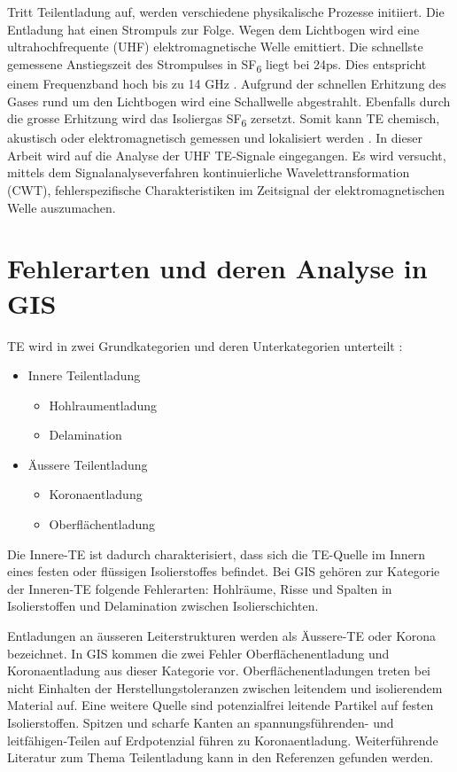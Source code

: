 \begin{refsection}
Tritt Teilentladung auf, werden verschiedene  physikalische Prozesse initiiert. 
Die Entladung hat einen Strompuls zur Folge.
Wegen dem Lichtbogen wird eine ultrahochfrequente (UHF) elektromagnetische Welle emittiert.
Die schnellste gemessene Anstiegszeit des Strompulses in SF\textsubscript{6} liegt bei 24ps.
Dies entspricht einem Frequenzband hoch bis zu 14 GHz \cite{skript:Judd24ps}. 
Aufgrund der schnellen Erhitzung des Gases rund um den Lichtbogen wird eine Schallwelle abgestrahlt. 
Ebenfalls durch die grosse Erhitzung wird das Isoliergas SF\textsubscript{6} zersetzt. 
Somit kann TE chemisch, akustisch oder elektromagnetisch gemessen und lokalisiert werden \cite{skript:StatusReviewPDMeasurement}.
In dieser Arbeit wird auf die Analyse der UHF TE-Signale eingegangen.
Es wird versucht, mittels dem Signalanalyseverfahren kontinuierliche Wavelettransformation (CWT), fehlerspezifische Charakteristiken im Zeitsignal der elektromagnetischen Welle auszumachen.

\section{Fehlerarten und deren Analyse in GIS}

TE wird in zwei Grundkategorien und deren Unterkategorien unterteilt \cite{buch:Kuchler}: 
\begin{itemize}
	\item Innere Teilentladung
	 \begin{itemize}
	 	\item Hohlraumentladung
	 	\item Delamination
	\end{itemize}
	\item Äussere Teilentladung
	\begin{itemize}
		\item Koronaentladung
		\item Oberflächentladung
	\end{itemize}
\end{itemize}
%
%
%
Die Innere-TE ist dadurch charakterisiert, dass sich die TE-Quelle im Innern eines festen oder flüssigen Isolierstoffes befindet. 
Bei GIS gehören zur Kategorie der Inneren-TE folgende Fehlerarten: Hohlräume, Risse und Spalten in Isolierstoffen und Delamination zwischen Isolierschichten.
 
Entladungen an äusseren Leiterstrukturen werden als Äussere-TE oder Korona bezeichnet. 
In GIS kommen die zwei Fehler Oberflächenentladung und Koronaentladung aus dieser Kategorie vor.
Oberflächenentladungen treten bei nicht Einhalten der Herstellungstoleranzen zwischen leitendem und isolierendem Material auf.
Eine weitere Quelle sind potenzialfrei leitende Partikel auf festen Isolierstoffen.
Spitzen und scharfe Kanten an spannungsführenden- und leitfähigen-Teilen auf Erdpotenzial führen zu Koronaentladung.
Weiterführende Literatur zum Thema Teilentladung kann in den Referenzen \cite{buch:Kuchler,skript:InnereTE,skript:AeussreTE} gefunden werden.


\end{refsection}
